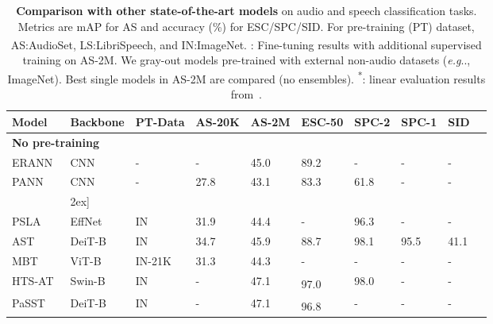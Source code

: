 \documentclass{article}
\makeatletter
\DeclareRobustCommand\onedot{\futurelet\@let@token\@onedot}
\def\@onedot{\ifx\@let@token.\else.\null\fi\xspace}
\def\eg{\emph{e.g}\onedot} \def\Eg{\emph{E.g}\onedot}
\makeatother
\begin{document}
\begin{table}[t!]
\vspace{-1em}
\setlength\tabcolsep{3.0pt}
\small
\begin{center}
\begin{tabular}{llllllllll} 
\multicolumn{1}{l}{Model} & \multicolumn{1}{l}{Backbone} & PT-Data & AS-20K & AS-2M & ESC-50 & SPC-2 & SPC-1 & SID \\
\midrule
\multicolumn{3}{l}{\textbf{No pre-training}} & \multicolumn{5}{l}{}\\
ERANN~\cite{verbitskiy2021eranns} & CNN & -& - & 45.0 & 89.2 & - & -& - \\
PANN~\cite{kong2019panns} & CNN & - & 27.8 & 43.1 & 83.3 & 61.8 &- &-  \\
\hline & \-2ex]
\multicolumn{3}{l}{\textbf{Out-of-domain supervised pre-training}}& \multicolumn{5}{l}{} \\
\color{gray}PSLA~\cite{gong2021psla} & \color{gray}EffNet~\cite{efficient} & \color{gray}IN & \color{gray}31.9 & \color{gray}44.4 & - & \color{gray}96.3 & - & \color{gray}- \\
\color{gray}AST~\cite{gong2021ast} & \color{gray}DeiT-B & \color{gray}IN &   \color{gray}34.7 & \color{gray}45.9 & \color{gray}88.7 & \color{gray}98.1 & \color{gray}95.5 & \color{gray}41.1 \\ 
\color{gray}MBT~\cite{Nagrani21c} & \color{gray}ViT-B & \color{gray}IN-21K &  \color{gray}31.3 & \color{gray}44.3 & - & - & - & - \\
\color{gray}HTS-AT~\cite{chen2022hts} & \color{gray}Swin-B & \color{gray}IN & - & \color{gray}47.1 & \color{gray}97.0\textsuperscript{} & \color{gray}98.0 & - & - \\
\color{gray}PaSST~\cite{paast} & \color{gray}DeiT-B & \color{gray}IN & - & \color{gray}47.1 & \color{gray}96.8\textsuperscript{} & - & - & - \\
\end{tabular}
\vspace{5pt}
\caption{
\textbf{Comparison with other state-of-the-art models} on audio and speech classification tasks.
Metrics are mAP for AS and accuracy (\%) for ESC/SPC/SID.
For pre-training (PT) dataset, AS:AudioSet, LS:LibriSpeech, and IN:ImageNet. 
\textsuperscript{}: Fine-tuning results with additional supervised training on AS-2M. 
We {\color{gray}gray-out} models pre-trained with external non-audio datasets (\eg, ImageNet).
Best single models in AS-2M are compared (no ensembles). \textsuperscript{*}: linear evaluation results from~\cite{yang21c_interspeech}.
}
\label{tab:sota}
\end{center}
\end{table}
\end{document}
